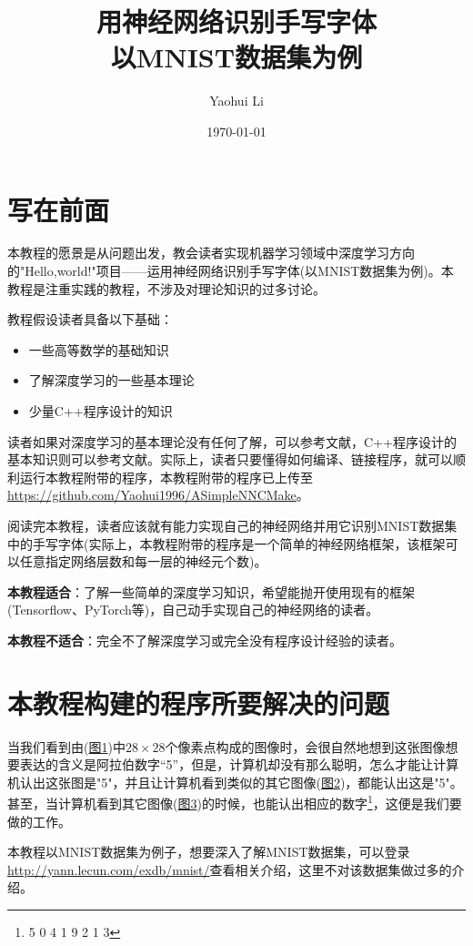\documentclass[titlepage,UTF8,zihao=-4]{ctexart}
\title{用神经网络识别手写字体\\以MNIST数据集为例}
\author{Yaohui Li}
\date{\today}
\begin{document}
\maketitle
\section{写在前面}
本教程的愿景是从问题出发，教会读者实现机器学习领域中深度学习方向的"Hello,world!"项目——运用神经网络识别手写字体(以MNIST数据集为例)。本教程是注重实践的教程，不涉及对理论知识的过多讨论。

教程假设读者具备以下基础：
\begin{itemize}
    \item 一些高等数学的基础知识
    \item 了解深度学习的一些基本理论
    \item 少量C++程序设计的知识
\end{itemize}

读者如果对深度学习的基本理论没有任何了解，可以参考文献\cite{LH,MN}，C++程序设计的基本知识则可以参考文献\cite{CPP}。实际上，读者只要懂得如何编译、链接程序，就可以顺利运行本教程附带的程序，本教程附带的程序已上传至\url{https://github.com/Yaohui1996/ASimpleNNCMake}。

阅读完本教程，读者应该就有能力实现自己的神经网络并用它识别MNIST数据集中的手写字体(实际上，本教程附带的程序是一个简单的神经网络框架，该框架可以任意指定网络层数和每一层的神经元个数)。

\textbf{本教程适合}：了解一些简单的深度学习知识，希望能抛开使用现有的框架(Tensorflow、PyTorch等)，自己动手实现自己的神经网络的读者。

\textbf{本教程不适合}：完全不了解深度学习或完全没有程序设计经验的读者。



\section{本教程构建的程序所要解决的问题}
当我们看到由(\hyperref[im1]{图1})中$28\times28$个像素点构成的图像时，会很自然地想到这张图像想要表达的含义是阿拉伯数字“5”，但是，计算机却没有那么聪明，怎么才能让计算机认出这张图是"5"，并且让计算机看到类似的其它图像(\hyperref[im2]{图2})，都能认出这是"5"。甚至，当计算机看到其它图像(\hyperref[im3]{图3})的时候，也能认出相应的数字\footnote{5 0 4 1 9 2 1 3}，这便是我们要做的工作。

本教程以MNIST数据集为例子，想要深入了解MNIST数据集，可以登录\url{http://yann.lecun.com/exdb/mnist/}查看相关介绍，这里不对该数据集做过多的介绍。
\end{document}

